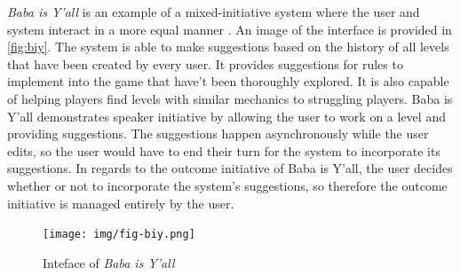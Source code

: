 \emph{Baba is Y'all} is an example of a mixed-initiative system where the user and system
interact in a more equal manner \cite{charity2020}. An image of the interface is provided in
\autoref{fig:biy}. The system is able to make suggestions based on the history of all levels
that have been created by every user. It provides suggestions for rules to implement into
the game that have't been thoroughly explored. It is also capable of helping players find
levels with similar mechanics to struggling players. Baba is Y'all demonstrates speaker
initiative by allowing the user to work on a level and providing suggestions. The
suggestions happen asynchronously while the user edits, so the user would have to end their
turn for the system to incorporate its suggestions. In regards to the outcome initiative of
Baba is Y'all, the user decides whether or not to incorporate the system's suggestions, so
therefore the outcome initiative is managed entirely by the user.

\begin{figure}[h]
    \texttt{[image: img/fig-biy.png]}
    \caption{Inteface of \emph{Baba is Y'all}}
    \label{fig:biy}
\end{figure}

